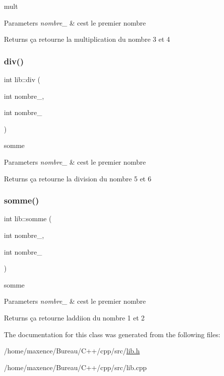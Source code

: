 mult 


\begin{DoxyParams}{Parameters}
{\em nombre\+\_} & c\textquotesingle{}est le premier nombre \\
\hline
\end{DoxyParams}
\begin{DoxyReturn}{Returns}
ça retourne la multiplication du nombre 3 et 4 
\end{DoxyReturn}
\mbox{\label{classlib_a6fbc4f750800b874e00243d883502011}} 
\subsubsection{\texorpdfstring{div()}{div()}}
{\footnotesize\ttfamily int lib\+::div (\begin{DoxyParamCaption}\item[{int}]{nombre\+\_,  }\item[{int}]{nombre\+\_ }\end{DoxyParamCaption})}



somme 


\begin{DoxyParams}{Parameters}
{\em nombre\+\_} & c\textquotesingle{}est le premier nombre \\
\hline
\end{DoxyParams}
\begin{DoxyReturn}{Returns}
ça retourne la division du nombre 5 et 6 
\end{DoxyReturn}
\mbox{\label{classlib_a3ac2a339fc371a6d8e6f7fd1bf21e3da}} 
\subsubsection{\texorpdfstring{somme()}{somme()}}
{\footnotesize\ttfamily int lib\+::somme (\begin{DoxyParamCaption}\item[{int}]{nombre\+\_,  }\item[{int}]{nombre\+\_ }\end{DoxyParamCaption})}



somme 


\begin{DoxyParams}{Parameters}
{\em nombre\+\_} & c\textquotesingle{}est le premier nombre \\
\hline
\end{DoxyParams}
\begin{DoxyReturn}{Returns}
ça retourne l\textquotesingle{}addiion du nombre 1 et 2 
\end{DoxyReturn}


The documentation for this class was generated from the following files\+:\begin{DoxyCompactItemize}
\item 
/home/maxence/\+Bureau/\+C++/cpp/src/\hyperlink{lib_8h}{lib.\+h}\item 
/home/maxence/\+Bureau/\+C++/cpp/src/lib.\+cpp\end{DoxyCompactItemize}

